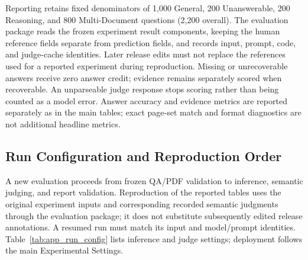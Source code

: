 \documentclass{article} %
\begin{document}
Reporting retains fixed denominators of 1,000 General, 200 Unanswerable, 200 Reasoning, and 800 Multi-Document questions (2,200 overall). The evaluation package reads the frozen experiment result components, keeping the human reference fields separate from prediction fields, and records input, prompt, code, and judge-cache identities. Later release edits must not replace the references used for a reported experiment during reproduction. Missing or unrecoverable answers receive zero answer credit; evidence remains separately scored when recoverable. An unparseable judge response stops scoring rather than being counted as a model error. Answer accuracy and evidence metrics are reported separately as in the main tables; exact page-set match and format diagnostics are not additional headline metrics.

\subsection{Run Configuration and Reproduction Order}
\label{app:reproduction}

A new evaluation proceeds from frozen QA/PDF validation to inference, semantic judging, and report validation. Reproduction of the reported tables uses the original experiment inputs and corresponding recorded semantic judgments through the evaluation package; it does not substitute subsequently edited release annotations. A resumed run must match its input and model/prompt identities. Table~\ref{tab:app_run_config} lists inference and judge settings; deployment follows the main Experimental Settings.
\end{document}
